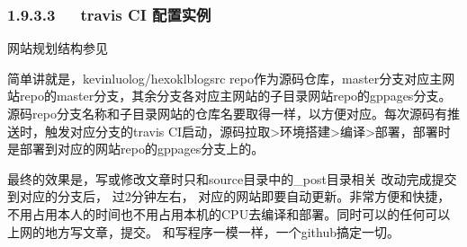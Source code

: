 \documentclass[letterpaper,12pt,english]{sphinxmanual}
\begin{document}
\begin{enumerate}
\begin{itemize}
\begin{enumerate}
\end{enumerate}

\begin{sphinxVerbatim}[commandchars=\\\{\}]
 
   
   
   
\end{sphinxVerbatim}

\end{itemize}

\end{enumerate}


\subsubsection{1.9.3.3   travis CI 配置实例}
\label{\detokenize{001software/001install/001._u7f51_u7ad9/hexo:id24}}
网站规划结构参见 {\hyperref[\detokenize{001software/001install/001._u7f51_u7ad9/hexo:my-deploy-kevinluolog-github-io}]{}}

简单讲就是，kevinluolog/hexo\sphinxhyphen{}klblog\sphinxhyphen{}src repo作为源码仓库，master分支对应主网站repo的master分支，其余分支各对应主网站的子目录网站repo的gp\sphinxhyphen{}pages分支。源码repo分支名称和子目录网站的仓库名要取得一样，以方便对应。每次源码有推送时，触发对应分支的travis CI启动，源码拉取\sphinxhyphen{}>环境搭建\sphinxhyphen{}>编译\sphinxhyphen{}>部署，部署时是部署到对应的网站repo的gp\sphinxhyphen{}pages分支上的。

最终的效果是，写或修改文章时只和source目录中的\_post目录相关  改动完成提交到对应的分支后， 过2分钟左右， 对应的网站即要自动更新。非常方便和快捷，不用占用本人的时间也不用占用本机的CPU去编译和部署。同时可以的任何可以上网的地方写文章，提交。 和写程序一模一样，一个github搞定一切。
\end{document}
